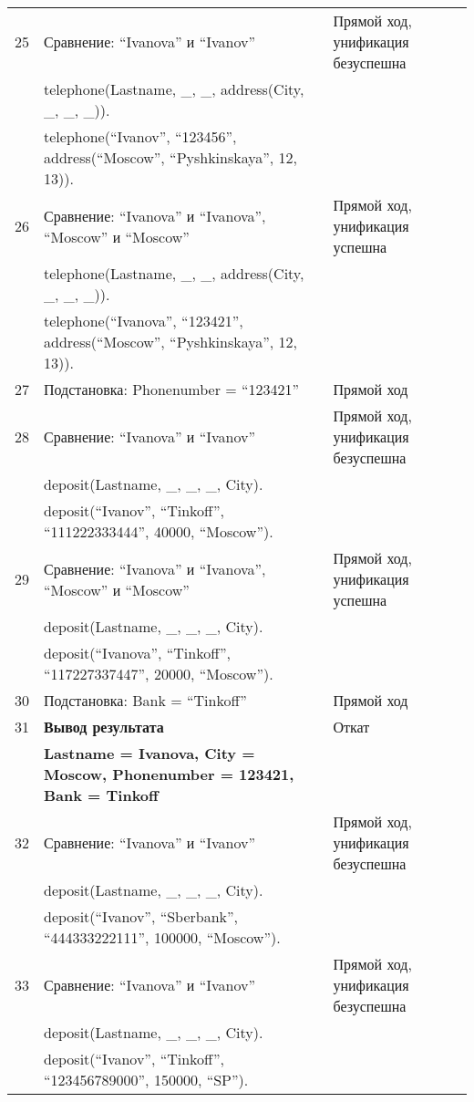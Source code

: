 {\begin{longtable}{|p{1.15cm}|p{8cm}|p{8cm}|}
    \hline
    25 & Сравнение: ``Ivanova'' и ``Ivanov'' & Прямой ход, унификация безуспешна \\
      & telephone(Lastname, \_, \_, address(City, \_, \_, \_)). & \\
      & telephone(``Ivanov'', ``123456'', address(``Moscow'', ``Pyshkinskaya'', 12, 13)). & \\
    \hline
    26 & Сравнение: ``Ivanova'' и ``Ivanova'', ``Moscow'' и ``Moscow'' & Прямой ход, унификация успешна \\
      & telephone(Lastname, \_, \_, address(City, \_, \_, \_)). & \\
      & telephone(``Ivanova'', ``123421'', address(``Moscow'', ``Pyshkinskaya'', 12, 13)). & \\
    \hline
    27 & Подстановка: Phonenumber = ``123421'' & Прямой ход \\
    \hline
    28 & Сравнение: ``Ivanova'' и ``Ivanov'' & Прямой ход, унификация безуспешна \\
      & deposit(Lastname, \_, \_, \_, City). & \\
      & deposit(``Ivanov'', ``Tinkoff'', ``111222333444'', 40000, ``Moscow''). & \\
    \hline
    29 & Сравнение: ``Ivanova'' и ``Ivanova'', ``Moscow'' и ``Moscow'' & Прямой ход, унификация успешна \\
      & deposit(Lastname, \_, \_, \_, City). & \\
      & deposit(``Ivanova'', ``Tinkoff'', ``117227337447'', 20000, ``Moscow''). & \\
    \hline
    30 & Подстановка: Bank = ``Tinkoff'' & Прямой ход \\
    \hline
    31 & \textbf{Вывод результата} & Откат \\
      & \textbf{Lastname = Ivanova, City = Moscow, Phonenumber = 123421, Bank = Tinkoff} & \\
    \hline
    32 & Сравнение: ``Ivanova'' и ``Ivanov'' & Прямой ход, унификация безуспешна \\
       & deposit(Lastname, \_, \_, \_, City). & \\
       & deposit(``Ivanov'', ``Sberbank'', ``444333222111'', 100000, ``Moscow''). & \\
    \hline
    33 & Сравнение: ``Ivanova'' и ``Ivanov'' & Прямой ход, унификация безуспешна \\
       & deposit(Lastname, \_, \_, \_, City). & \\
       & deposit(``Ivanov'', ``Tinkoff'', ``123456789000'', 150000, ``SP''). & \\

\end{longtable}}
